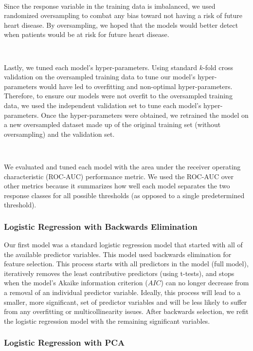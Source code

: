 \documentclass[10pt]{article}
\begin{document}
\

Since the response variable in the training data is imbalanced, we used randomized oversampling to combat any bias toward not having a risk of future heart disease. By oversampling, we hoped that the models would better detect when patients would be at risk for future heart disease. 

\

Lastly, we tuned each model's hyper-parameters. Using standard $k$-fold cross validation on the oversampled training data to tune our model's hyper-parameters would have led to overfitting and non-optimal hyper-parameters. Therefore, to ensure our models were not overfit to the oversampled training data, we used the independent validation set to tune each model's hyper-parameters. Once the hyper-parameters were obtained, we retrained the model on a new oversampled dataset made up of the original training set (without oversampling) and the validation set.

\

We evaluated and tuned each model with the area under the receiver operating characteristic (ROC-AUC) performance metric. We used the ROC-AUC over other metrics because it summarizes how well each model separates the two response classes for all possible thresholds (as opposed to a single predetermined threshold).

\subsubsection*{Logistic Regression with Backwards Elimination}

Our first model was a standard logistic regression model that started with all of the available predictor variables. This model used backwards elimination for feature selection. This process starts with all predictors in the model (full model), iteratively removes the least contributive predictors (using t-tests), and stops when the model's Akaike information criterion ($AIC$) can no longer decrease from a removal of an individual predictor variable. Ideally, this process will lead to a smaller, more significant, set of predictor variables and will be less likely to suffer from any overfitting or multicollinearity issues. After backwards selection, we refit the logistic regression model with the remaining significant variables. 

\subsubsection*{Logistic Regression with PCA}
\end{document}
